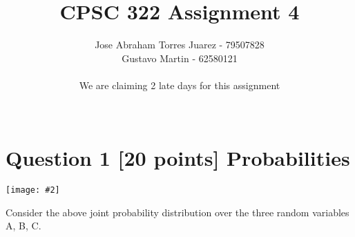 \documentclass{article}
\newcommand{\centerfig}[2]{\begin{center}\texttt{[image: \#2]}\end{center}}
\begin{document}
\title{CPSC 322 Assignment 4}
\author{
    Jose Abraham Torres Juarez - 79507828 \\
    Gustavo Martin - 62580121 \\ \\
    We are claiming 2 late days for this assignment \\ \\
}
\date{}
\maketitle
\vspace{-2em}


\section{Question 1 [20 points] Probabilities}
\centerfig{0.35}{../figs/fig1.png}
Consider the above joint probability distribution over the three random variables A, B, C. \\
\end{document}
